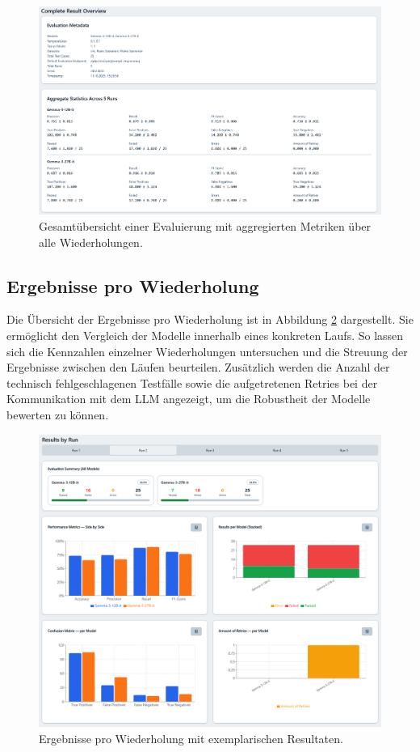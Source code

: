 \begin{figure}[h]
    \centering
    \includegraphics[width=\textwidth]{images/evaluation/evaluation-result-overview_new}
    \caption{Gesamtübersicht einer Evaluierung mit aggregierten Metriken über alle Wiederholungen.}
    \label{fig:evaluation-overview}
\end{figure}

\subsection*{Ergebnisse pro Wiederholung}

Die Übersicht der Ergebnisse pro Wiederholung ist in Abbildung \ref{fig:evaluation-by-run} dargestellt. Sie ermöglicht den Vergleich der Modelle innerhalb eines konkreten Laufs. So lassen sich die Kennzahlen einzelner Wiederholungen untersuchen und die Streuung der Ergebnisse zwischen den Läufen beurteilen. Zusätzlich werden die Anzahl der technisch fehlgeschlagenen Testfälle sowie die aufgetretenen Retries bei der Kommunikation mit dem \ac{LLM} angezeigt, um die Robustheit der Modelle bewerten zu können.

\begin{figure}[h]
    \centering
    \includegraphics[width=\textwidth]{images/evaluation/evaluation-result-by-run_new}
    \caption{Ergebnisse pro Wiederholung mit exemplarischen Resultaten.}
    \label{fig:evaluation-by-run}
\end{figure}


